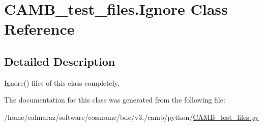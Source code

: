 \hypertarget{classCAMB__test__files_1_1Ignore}{}\section{C\+A\+M\+B\+\_\+test\+\_\+files.\+Ignore Class Reference}
\label{classCAMB__test__files_1_1Ignore}


\subsection{Detailed Description}
\begin{DoxyVerb}Ignore() files of this class completely.
\end{DoxyVerb}
 

The documentation for this class was generated from the following file\+:\begin{DoxyCompactItemize}
\item 
/home/ealmaraz/software/cosmomc/bde/v3./camb/python/\mbox{\hyperlink{CAMB__test__files_8py}{C\+A\+M\+B\+\_\+test\+\_\+files.\+py}}\end{DoxyCompactItemize}
